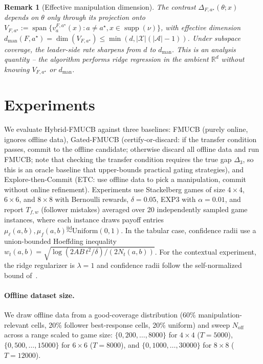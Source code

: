 \documentclass{article}
\newcommand{\cA}{\mathcal{A}}
\newcommand{\cX}{\mathcal{X}}
\newcommand{\R}{\mathbb{R}}
\newtheorem{remark}[theorem]{Remark}
\begin{document}
\begin{remark}[Effective manipulation dimension]
The contrast $\Delta_{F,a^\star}(\theta;x)$ depends on $\theta$ only through its projection onto $V_{F,a^\star}:=\operatorname{span}\{v_a^{F,a^\star}(x):a\neq a^\star,x\in\operatorname{supp}(\nu)\}$, with effective dimension $d_{\mathrm{man}}(F,a^\star)=\dim(V_{F,a^\star})\le\min(d,|\cX|(|\cA|-1))$. Under subspace coverage, the leader-side rate sharpens from $d$ to $d_{\mathrm{man}}$. This is an analysis quantity -- the algorithm performs ridge regression in the ambient $\R^d$ without knowing $V_{F,a^\star}$ or $d_{\mathrm{man}}$.
\end{remark}

\section{Experiments}
\label{sec:experiments}
We evaluate Hybrid-FMUCB against three baselines: FMUCB (purely online, ignores offline data), Gated-FMUCB (certify-or-discard: if the transfer condition passes, commit to the offline candidate; otherwise discard all offline data and run FMUCB; note that checking the transfer condition requires the true gap $\Delta_3$, so this is an oracle baseline that upper-bounds practical gating strategies), and Explore-then-Commit (ETC: use offline data to pick a manipulation, commit without online refinement). Experiments use Stackelberg games of size $4\times 4$, $6\times 6$, and $8\times 8$ with Bernoulli rewards, $\delta=0.05$, EXP3 with $\alpha=0.01$, and report $T_{f,w}$ (follower mistakes) averaged over 20 independently sampled game instances, where each instance draws payoff entries $\mu_\ell(a,b),\mu_f(a,b)\overset{\mathrm{iid}}{\sim}\mathrm{Uniform}(0,1)$. In the tabular case, confidence radii use a union-bounded Hoeffding inequality $w_t(a,b)=\sqrt{\log(2AB\,t^2/\delta)/(2N_t(a,b))}$. For the contextual experiment, the ridge regularizer is $\lambda=1$ and confidence radii follow the self-normalized bound of~\cite{abbasi2011improved}.

\paragraph{Offline dataset size.}
We draw offline data from a good-coverage distribution (60\% manipulation-relevant cells, 20\% follower best-response cells, 20\% uniform) and sweep $N_{\mathrm{off}}$ across a range scaled to game size: $\{0,200,\ldots,8000\}$ for $4\times 4$ ($T=5000$), $\{0,500,\ldots,15000\}$ for $6\times 6$ ($T=8000$), and $\{0,1000,\ldots,30000\}$ for $8\times 8$ ($T=12000$).
\end{document}
